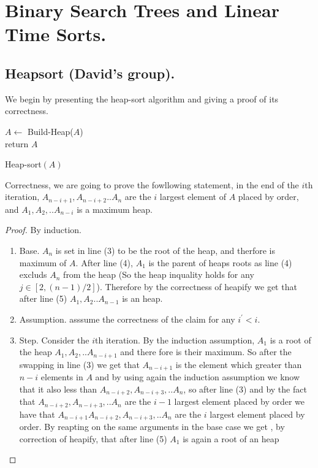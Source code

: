 


\ifdefined\BOOK
\else
\setcounter{chapter}{5}
\fi
\chapter{Binary Search Trees and Linear Time Sorts.} 

\section{Heapsort (David's group).}
We begin by presenting the heap-sort algorithm and giving a proof of its correctness.
\begin{algorithm}
    $A \leftarrow$ Build-Heap($A$)\\
	  return $A$
\caption{Heap-sort$(A)$}
  \end{algorithm}
  Correctness, we are going to prove the fowllowing statement, in the end of the $i$th iteration, $A_{n-i+1},A_{n-i+2}..A_{n}$ are the $i$ largest element of $A$ placed by order, and $A_{1},A_{2},..A_{n-i}$ is a maximum heap. 
  \begin{proof}
    By induction.
    \begin{enumerate}
      \item Base. $A_{n}$ is set in line (3) to be the root of the heap, and therfore is maximum of $A$. After line (4), $A_{1}$ is the parent of heaps roots as line (4) excluds $A_{n}$ from the heap (So the heap inquality holds for any $j\in [2,(n-1)/2]$). Therefore by the correctness of heapify we get that after line (5) $A_{1},A_{2}..A_{n-1}$ is an heap.  
      \item Assumption. asssume the correctness of the claim for any $i^{\prime}<i$.
      \item Step. Consider the $i$th iteration. By the induction assumption, $A_{1}$ is a root of the heap $A_{1},A_{2},..A_{n-i+1}$ and there fore is their maximum. So after the swapping in line (3) we get that $A_{n-i+1}$ is the element which greater than $n-i$ elements in $A$ and by using again the induction assumption we know that it also less than $A_{n-i+2},A_{n-i+3},..A_{n}$, so after line (3) and by the fact that  $A_{n-i+2},A_{n-i+3},..A_{n}$ are the $i-1$ largest element placed by order we have that  $A_{n-i+1}A_{n-i+2},A_{n-i+3},..A_{n}$ are the $i$ largest element placed by order. By reapting on the same arguments in the base case we get , by correction of heapify, that after line (5) $A_{1}$ is again a root of an  heap
    \end{enumerate}
  \end{proof}

